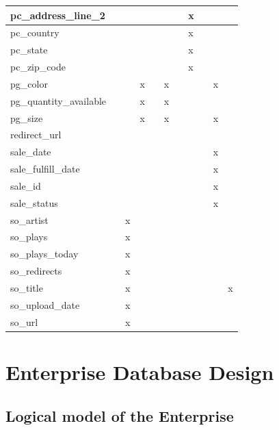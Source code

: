\documentclass[11pt, a4paper]{report}
\begin{document}
\begin{longtable}{|l|l|l|l|l|l|l|l|l|l|l|}
pc\_address\_line\_2    &   &   &   &   &   &   & x &   &   &   \\ \hline
pc\_country             &   &   &   &   &   &   & x &   &   &   \\ \hline
pc\_state               &   &   &   &   &   &   & x &   &   &   \\ \hline
pc\_zip\_code           &   &   &   &   &   &   & x &   &   &   \\ \hline
pg\_color               &   &   & x &   & x &   &   &   & x &   \\ \hline
pg\_quantity\_available &   &   & x &   & x &   &   &   &   &   \\ \hline
pg\_size                &   &   & x &   & x &   &   &   & x &   \\ \hline
redirect\_url           &   &   &   &   &   &   &   &   &   &   \\ \hline
sale\_date              &   &   &   &   &   &   &   &   & x &   \\ \hline
sale\_fulfill\_date     &   &   &   &   &   &   &   &   & x &   \\ \hline
sale\_id                &   &   &   &   &   &   &   &   & x &   \\ \hline
sale\_status            &   &   &   &   &   &   &   &   & x &   \\ \hline
so\_artist              &   & x &   &   &   &   &   &   &   &   \\ \hline
so\_plays               &   & x &   &   &   &   &   &   &   &   \\ \hline
so\_plays\_today        &   & x &   &   &   &   &   &   &   &   \\ \hline
so\_redirects           &   & x &   &   &   &   &   &   &   &   \\ \hline
so\_title               &   & x &   &   &   &   &   &   &   & x \\ \hline
so\_upload\_date        &   & x &   &   &   &   &   &   &   &   \\ \hline
so\_url                 &   & x &   &   &   &   &   &   &   &   \\ \hline

\end{longtable}

\chapter{Enterprise Database Design}

\section{Logical model of the Enterprise}
\end{document}
